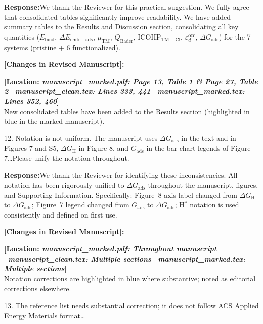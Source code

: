 \documentclass[11pt, sans, a4paper]{moderncv}
\newcommand{\response}{\vspace{0.4em}\noindent\textbf{\color{actionblue}Response:}\hspace{0.5em}}
\newcommand{\manuscriptchange}[1]{\vspace{0.4em}\noindent\textbf{\color{acsblue}[Changes in Revised Manuscript]:}\par\nopagebreak\vspace{0.15em}#1\vspace{0.4em}}
\begin{document}
\response We thank the Reviewer for this practical suggestion. We fully agree that consolidated tables significantly improve readability. We have added summary tables to the Results and Discussion section, consolidating all key quantities ($E_{\mathrm{bind}}$, $\Delta E_{\mathrm{emb-ads}}$, $\mu_{\mathrm{TM}}$, $Q_{\mathrm{Bader}}$, ICOHP$_{\mathrm{TM-Cl}}$, $\varepsilon_d^{\mathrm{occ}}$, $\Delta G_{\mathrm{ads}}$) for the 7 systems (pristine + 6 functionalized).

\manuscriptchange{\textbf{[Location: \textit{manuscript\_marked.pdf: Page 13, Table 1 \& Page 27, Table 2} \textbar\ \textit{manuscript\_clean.tex: Lines 333, 441} \textbar\ \textit{manuscript\_marked.tex: Lines 352, 460}]}\\ New consolidated tables have been added to the Results section (highlighted in blue in the marked manuscript).}

\vspace{0.8em}

\begin{reviewercomment}
12. Notation is not uniform. The manuscript uses $\Delta G_{\mathrm{ads}}$ in the text and in Figures 7 and S5, $\Delta G_{\mathrm{H}}$ in Figure 8, and $G_{\mathrm{ads}}$ in the bar-chart legends of Figure 7\ldots Please unify the notation throughout.
\end{reviewercomment}

\response We thank the Reviewer for identifying these inconsistencies. All notation has been rigorously unified to $\Delta G_{\mathrm{ads}}$ throughout the manuscript, figures, and Supporting Information. Specifically: Figure~8 axis label changed from $\Delta G_{\mathrm{H}}$ to $\Delta G_{\mathrm{ads}}$; Figure~7 legend changed from $G_{\mathrm{ads}}$ to $\Delta G_{\mathrm{ads}}$; H$^*$ notation is used consistently and defined on first use.

\manuscriptchange{\textbf{[Location: \textit{manuscript\_marked.pdf: Throughout manuscript} \textbar\ \textit{manuscript\_clean.tex: Multiple sections} \textbar\ \textit{manuscript\_marked.tex: Multiple sections}]}\\ Notation corrections are highlighted in blue where substantive; noted as editorial corrections elsewhere.}

\vspace{0.8em}

\begin{reviewercomment}
13. The reference list needs substantial correction; it does not follow ACS Applied Energy Materials format\ldots
\end{reviewercomment}
\end{document}
